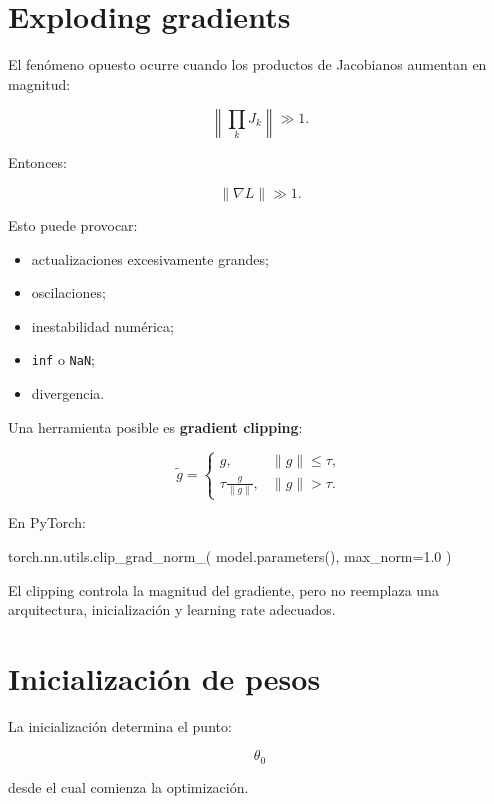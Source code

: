 \documentclass[
  letterpaper,
  DIV=11,
  numbers=noendperiod]{scrartcl}
\newenvironment{Shaded}{\begin{snugshade}}{\end{snugshade}}
\newcommand{\FloatTok}[1]{\textcolor[rgb]{0.68,0.00,0.00}{#1}}
\newcommand{\NormalTok}[1]{\textcolor[rgb]{0.00,0.23,0.31}{#1}}
\newcommand{\OperatorTok}[1]{\textcolor[rgb]{0.37,0.37,0.37}{#1}}
\providecommand{\tightlist}{%
  \setlength{\itemsep}{0pt}\setlength{\parskip}{0pt}}
\begin{document}
\section{Exploding gradients}\label{exploding-gradients}

El fenómeno opuesto ocurre cuando los productos de Jacobianos aumentan
en magnitud:

\[
\left\|
\prod_k J_k
\right\|
\gg1.
\]

Entonces:

\[
\boxed{
\|\nabla L\|
\gg1.
}
\]

Esto puede provocar:

\begin{itemize}
\tightlist
\item
  actualizaciones excesivamente grandes;
\item
  oscilaciones;
\item
  inestabilidad numérica;
\item
  \texttt{inf} o \texttt{NaN};
\item
  divergencia.
\end{itemize}

Una herramienta posible es \textbf{gradient clipping}:

\[
\tilde g
=
\begin{cases}
g,&\|g\|\leq\tau,\\[4pt]
\tau\frac{g}{\|g\|},&\|g\|>\tau.
\end{cases}
\]

En PyTorch:

\begin{Shaded}
\begin{Highlighting}[]
\NormalTok{torch.nn.utils.clip\_grad\_norm\_(}
\NormalTok{    model.parameters(),}
\NormalTok{    max\_norm}\OperatorTok{=}\FloatTok{1.0}
\NormalTok{)}
\end{Highlighting}
\end{Shaded}

El clipping controla la magnitud del gradiente, pero no reemplaza una
arquitectura, inicialización y learning rate adecuados.

\section{Inicialización de pesos}\label{inicializaciuxf3n-de-pesos}

La inicialización determina el punto:

\[
\theta_0
\]

desde el cual comienza la optimización.
\end{document}
